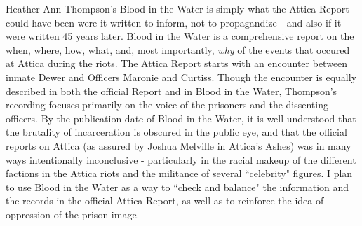 \documentclass[14pt, letterpaper]{article}
\begin{document}
\begin{adjustwidth}{2.5ex}{0pt}

  Heather Ann Thompson's Blood in the Water is simply what the 
  Attica Report could have been were it written to inform, not to 
  propagandize - and also if it were written 45 years later. Blood 
  in the Water is a comprehensive report on the when, where, how, what, 
  and, most importantly, \textit{why} of the events that occured at 
  Attica during the riots. The Attica Report starts with an encounter 
  between inmate Dewer and Officers Maronie and Curtiss. Though 
  the encounter is equally described in both the official Report and 
  in Blood in the Water, Thompson's recording focuses primarily on 
  the voice of the prisoners and the dissenting officers. By the 
  publication date of Blood in the Water, it is well understood 
  that the brutality of incarceration is obscured in the public 
  eye, and that the official reports on Attica (as assured by 
  Joshua Melville in Attica's Ashes) was in many ways 
  intentionally inconclusive - particularly in the racial makeup of the 
  different factions in the Attica riots and the militance of several 
  ``celebrity" figures. I plan to use Blood in the Water as a way to 
  ``check and balance" the information and the records in the official 
  Attica Report, as well as to reinforce the idea of oppression of the 
  prison image. 

\end{adjustwidth}


\clearpage

\nocite{*}

\printbibliography
\end{document}
